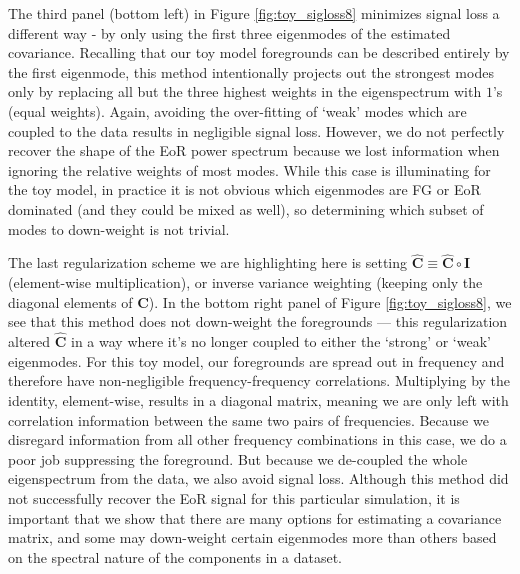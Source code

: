 \documentclass[preprint2,numberedappendix,tighten]{aastex6}  %
\begin{document}
The third panel (bottom left) in Figure \ref{fig:toy_sigloss8} minimizes signal loss a different way - 
by only using the first three eigenmodes of the estimated covariance. Recalling that our toy model foregrounds can be described entirely by the first eigenmode, this 
method intentionally projects out the strongest modes only by replacing all but the three highest weights in the 
eigenspectrum with $1$'s (equal weights). Again, avoiding the over-fitting of `weak' modes which are coupled to the data results in negligible signal loss. However, we do 
not perfectly recover the shape of the EoR power spectrum because we lost information when ignoring the relative weights of most modes. While this case is illuminating for the toy model, in practice it is not obvious which eigenmodes are FG or EoR dominated (and they could be mixed as well), so determining which subset of modes to down-weight is not trivial. 

The last regularization scheme we are highlighting here is setting $\widehat{\textbf{C}} \equiv \widehat{\textbf{C}} \circ \textbf{I}$ (element-wise multiplication), or inverse variance weighting (keeping only the diagonal elements of $\widehat{\textbf{C}}$). In the bottom right 
panel of Figure \ref{fig:toy_sigloss8}, we see that this method does not down-weight the foregrounds --- this regularization altered $\widehat{\textbf{C}}$ in a way where it's no longer coupled to either the `strong' or `weak' eigenmodes. For this toy model, 
our foregrounds are spread out in frequency and therefore have non-negligible frequency-frequency correlations. Multiplying by 
the identity, element-wise, results in a diagonal matrix, meaning we are only left with correlation information between the same 
two pairs of frequencies. Because we disregard information from all other frequency combinations in this case, we do a poor job 
suppressing the foreground. But because we de-coupled the whole eigenspectrum from the data, we also avoid signal loss. Although this method did not successfully recover the EoR signal for this particular simulation, it is important that we show that there 
are many options for estimating a covariance matrix, and some may down-weight certain eigenmodes more than others based on the spectral nature 
of the components in a dataset. 
\end{document}
